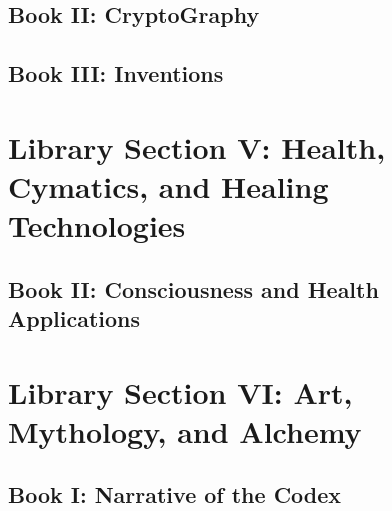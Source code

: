 \documentclass[a4paper,12pt]{book}
\begin{document}
\chapter{Book II: CryptoGraphy}



\chapter{Book III: Inventions}



\part{Library Section V: Health, Cymatics, and Healing Technologies}

\chapter{Book II: Consciousness and Health Applications}



\part{Library Section VI: Art, Mythology, and Alchemy}

\chapter{Book I: Narrative of the Codex}








\end{document}
